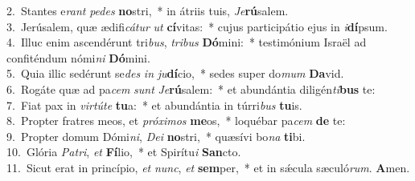 {2.~}Stantes e\textit{rant} \textit{pe}\textit{des} \textbf{no}stri,~* in átriis tuis, \textit{Je}\textbf{rú}salem.\\
{3.~}Jerúsalem, quæ ædifi\textit{cá}\textit{tur} \textit{ut} \textbf{cí}vitas:~* cujus participátio ejus in \textit{i}\textbf{dí}psum.\\
{4.~}Illuc enim ascendérunt tri\textit{bus}, \textit{tri}\textit{bus} \textbf{Dó}mini:~* testimónium Israël ad confiténdum nómi\textit{ni} \textbf{Dó}mini.\\
{5.~}Quia illic sedérunt se\textit{des} \textit{in} \textit{ju}\textbf{dí}cio,~* sedes super do\textit{mum} \textbf{Da}vid.\\
{6.~}Rogáte quæ ad pa\textit{cem} \textit{sunt} \textit{Je}\textbf{rú}salem:~* et abundántia diligén\textit{ti}\textbf{bus} te:\\
{7.~}Fiat pax in \textit{vir}\textit{tú}\textit{te} \textbf{tu}a:~* et abundántia in túrri\textit{bus} \textbf{tu}is.\\
{8.~}Propter fratres meos, et \textit{pró}\textit{xi}\textit{mos} \textbf{me}os,~* loquébar pa\textit{cem} \textbf{de} te:\\
{9.~}Propter domum Dómi\textit{ni}, \textit{De}\textit{i} \textbf{no}stri,~* quæsívi bo\textit{na} \textbf{ti}bi.\\
{10.~}Glória \textit{Pa}\textit{tri}, \textit{et} \textbf{Fí}lio,~* et Spirítu\textit{i} \textbf{San}cto.\\
{11.~}Sicut erat in princípio, \textit{et} \textit{nunc}, \textit{et} \textbf{sem}per,~* et in sǽcula sæculó\textit{rum}. \textbf{A}men.\\
